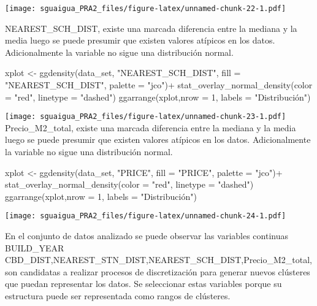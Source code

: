 \documentclass[
]{article}
\newenvironment{Shaded}{\begin{snugshade}}{\end{snugshade}}
\newcommand{\AttributeTok}[1]{\textcolor[rgb]{0.77,0.63,0.00}{#1}}
\newcommand{\DecValTok}[1]{\textcolor[rgb]{0.00,0.00,0.81}{#1}}
\newcommand{\FunctionTok}[1]{\textcolor[rgb]{0.00,0.00,0.00}{#1}}
\newcommand{\NormalTok}[1]{#1}
\newcommand{\OtherTok}[1]{\textcolor[rgb]{0.56,0.35,0.01}{#1}}
\newcommand{\SpecialCharTok}[1]{\textcolor[rgb]{0.00,0.00,0.00}{#1}}
\newcommand{\StringTok}[1]{\textcolor[rgb]{0.31,0.60,0.02}{#1}}
\begin{document}
\texttt{[image: sguaigua\_PRA2\_files/figure-latex/unnamed-chunk-22-1.pdf]}

NEAREST\_SCH\_DIST, existe una marcada diferencia entre la mediana y la
media luego se puede presumir que existen valores atípicos en los datos.
Adicionalmente la variable no sigue una distribución normal.

\begin{Shaded}
\begin{Highlighting}[]
\NormalTok{xplot }\OtherTok{\textless{}{-}} \FunctionTok{ggdensity}\NormalTok{(data\_set, }\StringTok{"NEAREST\_SCH\_DIST"}\NormalTok{, }\AttributeTok{fill =} \StringTok{"NEAREST\_SCH\_DIST"}\NormalTok{,}
                   \AttributeTok{palette =} \StringTok{"jco"}\NormalTok{)}\SpecialCharTok{+}
  \FunctionTok{stat\_overlay\_normal\_density}\NormalTok{(}\AttributeTok{color =} \StringTok{"red"}\NormalTok{, }\AttributeTok{linetype =} \StringTok{"dashed"}\NormalTok{)}
\FunctionTok{ggarrange}\NormalTok{(xplot,}\AttributeTok{nrow =} \DecValTok{1}\NormalTok{, }\AttributeTok{labels =} \StringTok{"Distribución"}\NormalTok{) }
\end{Highlighting}
\end{Shaded}

\texttt{[image: sguaigua\_PRA2\_files/figure-latex/unnamed-chunk-23-1.pdf]}
Precio\_M2\_total, existe una marcada diferencia entre la mediana y la
media luego se puede presumir que existen valores atípicos en los datos.
Adicionalmente la variable no sigue una distribución normal.

\begin{Shaded}
\begin{Highlighting}[]
\NormalTok{xplot }\OtherTok{\textless{}{-}} \FunctionTok{ggdensity}\NormalTok{(data\_set, }\StringTok{"PRICE"}\NormalTok{, }\AttributeTok{fill =} \StringTok{"PRICE"}\NormalTok{,}
                   \AttributeTok{palette =} \StringTok{"jco"}\NormalTok{)}\SpecialCharTok{+}
  \FunctionTok{stat\_overlay\_normal\_density}\NormalTok{(}\AttributeTok{color =} \StringTok{"red"}\NormalTok{, }\AttributeTok{linetype =} \StringTok{"dashed"}\NormalTok{)}
\FunctionTok{ggarrange}\NormalTok{(xplot,}\AttributeTok{nrow =} \DecValTok{1}\NormalTok{, }\AttributeTok{labels =} \StringTok{"Distribución"}\NormalTok{) }
\end{Highlighting}
\end{Shaded}

\texttt{[image: sguaigua\_PRA2\_files/figure-latex/unnamed-chunk-24-1.pdf]}

En el conjunto de datos analizado se puede observar las variables
continuas BUILD\_YEAR
CBD\_DIST,NEAREST\_STN\_DIST,NEAREST\_SCH\_DIST,Precio\_M2\_total, son
candidatas a realizar procesos de discretización para generar nuevos
clústeres que puedan representar los datos. Se seleccionar estas
variables porque su estructura puede ser representada como rangos de
clústeres.
\end{document}
